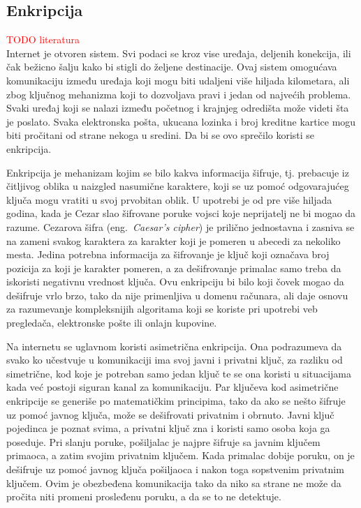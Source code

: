 \documentclass[a4paper]{article}
\newcommand\todos[1]{\textcolor{red}{#1}}
\begin{document}
\subsection{Enkripcija} 
\todos{TODO literatura} \\
Internet je otvoren sistem. Svi podaci se kroz vise uređaja, deljenih konekcija, ili čak bežicno šalju kako bi stigli do željene destinacije. Ovaj sistem omogućava komunikaciju između uređaja koji mogu biti udaljeni više hiljada kilometara, ali zbog ključnog mehanizma koji to dozvoljava pravi i jedan od najvećih problema. Svaki uređaj koji se nalazi između početnog i krajnjeg  odredišta može videti šta je poslato. Svaka elektronska pošta, ukucana lozinka i broj kreditne kartice mogu biti pročitani od strane nekoga u sredini. Da bi se ovo sprečilo koristi se enkripcija.
\par Enkripcija je mehanizam kojim se bilo kakva informacija šifruje, tj. prebacuje iz čitljivog oblika u naizgled nasumične karaktere, koji se uz pomoć odgovarajućeg ključa mogu vratiti u svoj prvobitan oblik. U upotrebi je od pre više hiljada godina, kada je Cezar slao šifrovane poruke vojsci koje neprijatelj ne bi mogao da razume. Cezarova šifra (eng.~{\em Caesar's cipher}) je prilično jednostavna i zasniva se na zameni svakog karaktera za karakter koji je pomeren u abecedi za nekoliko mesta. Jedina potrebna informacija za šifrovanje je ključ koji označava broj pozicija za koji je karakter pomeren, a za dešifrovanje primalac samo treba da iskoristi negativnu vrednost ključa. Ovu enkripciju bi bilo koji čovek mogao da dešifruje vrlo brzo, tako da nije primenljiva u domenu računara, ali daje osnovu za razumevanje kompleksnijih algoritama koji se koriste pri upotrebi veb pregledača, elektronske pošte ili onlajn kupovine.
\par Na internetu se uglavnom koristi asimetrična enkripcija. Ona podrazumeva da svako ko učestvuje u komunikaciji ima svoj javni i privatni ključ, za razliku od simetrične, kod koje je potreban samo jedan ključ te se ona koristi u situacijama kada već postoji siguran kanal za komunikaciju. Par ključeva kod asimetrične enkripcije se generiše po matematičkim principima, tako da ako se nešto šifruje uz pomoć javnog ključa, može se dešifrovati privatnim i obrnuto. Javni ključ pojedinca je poznat svima, a privatni ključ zna i koristi samo osoba koja ga poseduje. Pri slanju poruke, pošiljalac je najpre šifruje sa javnim ključem primaoca, a zatim svojim privatnim ključem. Kada primalac dobije poruku, on je dešifruje uz pomoć javnog ključa pošiljaoca i nakon toga sopstvenim privatnim ključem. Ovim je obezbeđena komunikacija tako da niko sa strane ne može da pročita niti promeni prosleđenu poruku, a da se to ne detektuje.
\end{document}
